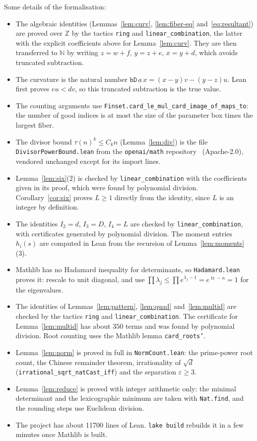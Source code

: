 \documentclass[11pt]{amsart}
\theoremstyle{definition}
\theoremstyle{remark}
\newcommand{\lean}[1]{\texttt{#1}}
\begin{document}
Some details of the formalisation:
\begin{itemize}
\item The algebraic identities (Lemmas~\ref{lem:curv}, \ref{lem:fiber-eq}
and~\eqref{eq:resultant}) are proved over $\mathbb Z$ by the tactics \lean{ring} and
\lean{linear\_combination}, the latter with the explicit coefficients above for
Lemma~\ref{lem:curv}. They are then transferred to $\mathbb N$ by writing
$z=w+f$, $y=z+e$, $x=y+d$, which avoids truncated subtraction.
\item The curvature is the natural number $\lean{bD}\,a\,x=(x-y)v-(y-z)u$. Lean first proves
$eu<dv$, so this truncated subtraction is the true value.
\item The counting arguments use \lean{Finset.card\_le\_mul\_card\_image\_of\_maps\_to}: the
number of good indices is at most the size of the parameter box times the largest fiber.
\item The divisor bound $\tau(n)^k\le C_kn$ (Lemma~\ref{lem:div}) is the file
\lean{DivisorPowerBound.lean} from the \lean{openai/math} repository~\cite{OAIMath}
(Apache-2.0), vendored unchanged except for its import lines.
\item Lemma~\ref{lem:six}(2) is checked by \lean{linear\_combination} with the coefficients
given in its proof, which were found by polynomial division. Corollary~\ref{cor:six} proves
$L\ge1$ directly from the identity, since $L$ is an integer by definition.
\item The identities $I_2=d$, $I_3=D$, $I_4=L$ are checked by \lean{linear\_combination}, with
certificates generated by polynomial division. The moment entries $h_i(s)$ are computed in Lean
from the recursion of Lemma~\ref{lem:moments}(3).
\item Mathlib has no Hadamard inequality for determinants, so \lean{Hadamard.lean} proves it:
rescale to unit diagonal, and use $\prod\lambda_j\le\prod e^{\lambda_j-1}=e^{\operatorname{tr}-n}=1$
for the eigenvalues.
\item The identities of Lemmas~\ref{lem:pattern}, \ref{lem:quad} and~\ref{lem:multid} are
checked by the tactics \lean{ring} and \lean{linear\_combination}. The certificate for
Lemma~\ref{lem:multid} has about $350$ terms and was found by polynomial division. Root
counting uses the Mathlib lemma \lean{card\_roots'}.
\item Lemma~\ref{lem:norm} is proved in full in \lean{NormCount.lean}: the prime-power root
count, the Chinese remainder theorem, irrationality of $\sqrt d$ (\lean{irrational\_sqrt\_natCast\_iff})
and the separation $\varepsilon\ge3$.
\item Lemma~\ref{lem:reduce} is proved with integer arithmetic only: the minimal
determinant and the lexicographic minimum are taken with \lean{Nat.find}, and the rounding steps
use Euclidean division.
\item The project has about 11700 lines of Lean. \lean{lake build} rebuilds it in a few
minutes once Mathlib is built.
\end{itemize}
\end{document}
